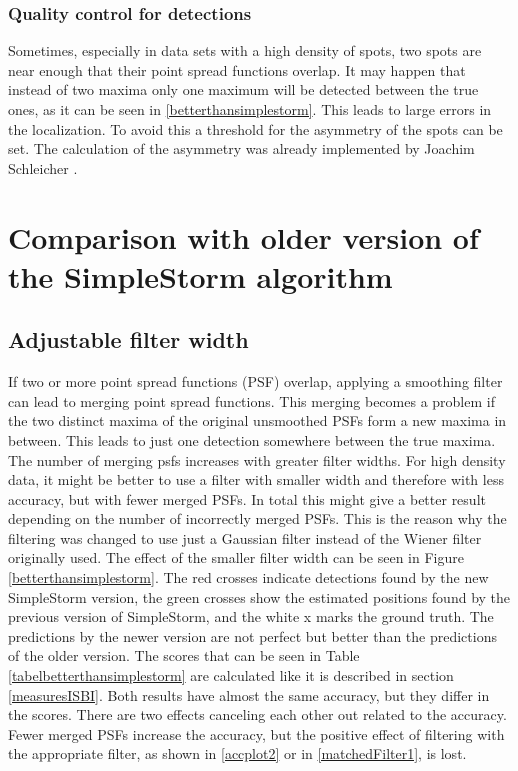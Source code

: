 \subsubsection{Quality control for detections}
Sometimes, especially in data sets with a high density of spots, two spots are near enough that their point spread functions overlap. It may happen that instead of two maxima only one maximum will be detected between the true ones, as it can be seen in \ref{betterthansimplestorm}. This leads to large errors in the localization. To avoid this a threshold for the asymmetry of the spots can be set.\newline
The calculation of the asymmetry was already implemented by Joachim Schleicher \cite{MAJoachim}.


\section{Comparison with older version of the SimpleStorm algorithm}
\subsection{Adjustable filter width} \label{sectionFilterisEvil}
If two or more point spread functions (PSF) overlap, applying a smoothing filter can lead to merging point spread functions. This merging becomes a problem if the two distinct maxima of the original unsmoothed PSFs form a new maxima in between. This leads to just one detection somewhere between the true maxima. The number of merging psfs increases with greater filter widths. For high density data, it might be better to use a filter with smaller width and therefore with less accuracy, but with fewer merged PSFs. In total this might give a better result depending on the number of incorrectly merged PSFs. This is the reason why the filtering was changed to use just a Gaussian filter instead of the Wiener filter originally used. 
The effect of the smaller filter width can be seen in Figure \ref{betterthansimplestorm}. The red crosses indicate detections found by the new SimpleStorm version, the green crosses show the estimated positions found by the previous version of SimpleStorm, and the white x marks the ground truth. The predictions by the newer version are not perfect but better than the predictions of the older version. The scores that can be seen in Table \ref{tabelbetterthansimplestorm} are calculated like it is described in section \ref{measuresISBI}. Both results have almost the same accuracy, but they differ in the scores. There are two effects canceling each other out related to the accuracy. Fewer merged PSFs increase the accuracy, but the positive effect of filtering with the appropriate filter, as shown in \ref{accplot2} or in \ref{matchedFilter1}, is lost.

